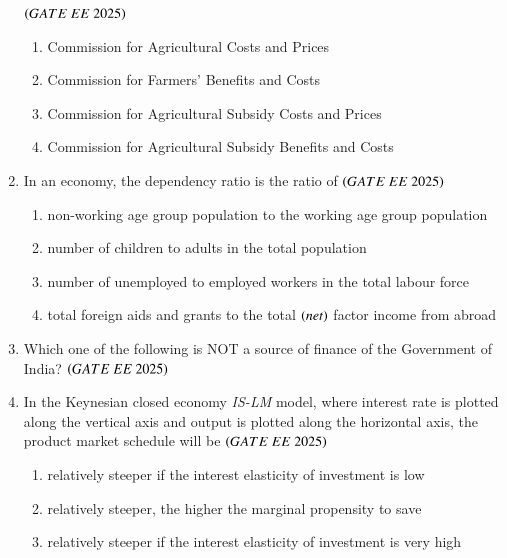 \documentclass[journal,12pt,onecolumn]{IEEEtran}
\theoremstyle{remark}
\begin{document}
\begin{enumerate}
\hfill $\brak{GATE\ EE\ 2025}$
    \begin{enumerate}
    \item Commission for Agricultural Costs and Prices
    \item Commission for Farmers' Benefits and Costs
    \item Commission for Agricultural Subsidy Costs and Prices
    \item Commission for Agricultural Subsidy Benefits and Costs
 \end{enumerate}
\item In an economy, the dependency ratio is the ratio of
\hfill $\brak{GATE\ EE\ 2025}$
    \begin{enumerate}
    \item non-working age group population to the working age group population
    \item number of children to adults in the total population
    \item number of unemployed to employed workers in the total labour force
    \item total foreign aids and grants to the total  $\left(net\right)$ factor income from abroad
  \end{enumerate}
\item Which one of the following is NOT a source of finance of the Government of India?
\hfill $\brak{GATE\ EE\ 2025}$
    \begin{enumerate}
       \end{enumerate}
\item In the Keynesian closed economy \textit{IS-LM} model, where interest rate is plotted along the vertical axis and output is plotted along the horizontal axis, the product market schedule will be
\hfill $\brak{GATE\ EE\ 2025}$
    \begin{enumerate}
    \item relatively steeper if the interest elasticity of investment is low
    \item relatively steeper, the higher the marginal propensity to save
    \item relatively steeper if the interest elasticity of investment is very high

\end{enumerate}
\end{enumerate}
\end{document}
